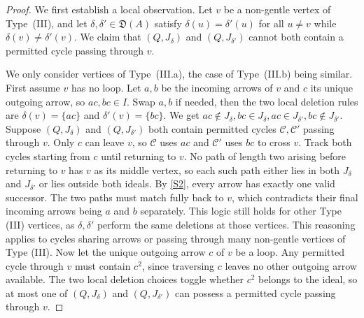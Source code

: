 \documentclass[11pt]{amsart}
\numberwithin{equation}{section}
\theoremstyle{definition}
\begin{document}
\begin{proof}
We first establish a local observation. Let \(v\) be a non-gentle vertex of Type~\textup{(III)}, and let \(\delta,\delta'\in\mathfrak D(A)\) satisfy \(\delta(u)=\delta'(u)\) for all \(u\neq v\) while \(\delta(v)\neq\delta'(v)\). We claim that \((Q,J_\delta)\) and \((Q,J_{\delta'})\) cannot both contain a permitted cycle passing through \(v\).

We only consider vertices of Type~\textup {(III.a)}, the case of Type~\textup {(III.b)} being similar. First assume \(v\) has no loop. Let \(a,b\) be the incoming arrows of \(v\) and \(c\) its unique outgoing arrow, so \(ac,bc\in I\). Swap \(a,b\) if needed, then the two local deletion rules are \(\delta(v)=\{ac\}\) and \(\delta'(v)=\{bc\}\). We get \(ac\notin J_\delta, bc\in J_\delta, ac\in J_{\delta'}, bc\notin J_{\delta'}\).
Suppose \((Q,J_\delta)\) and \((Q,J_{\delta'})\) both contain permitted cycles \(\mathcal C,\mathcal C'\) passing through \(v\). Only \(c\) can leave \(v\), so \(\mathcal C\) uses \(ac\) and \(\mathcal C'\) uses \(bc\) to cross \(v\). Track both cycles starting from \(c\) until returning to \(v\). No path of length two arising before returning to \(v\) has \(v\) as its middle vertex, so each such path either lies in both \(J_\delta\) and \(J_{\delta'}\) or lies outside both ideals. By \ref{S2}, every arrow has exactly one valid successor. The two paths must match fully back to \(v\), which contradicts their final incoming arrows being \(a\) and \(b\) separately. This logic still holds for other Type \textup{(III)} vertices, as \(\delta,\delta'\) perform the same deletions at those vertices. This reasoning applies to cycles sharing arrows or passing through many non-gentle vertices of Type \textup{(III)}.
Now let the unique outgoing arrow \(c\) of \(v\) be a loop. Any permitted cycle through \(v\) must contain \(c^2\), since traversing \(c\) leaves no other outgoing arrow available. The two local deletion choices toggle whether \(c^2\) belongs to the ideal, so at most one of $(Q,J_\delta)$ and $(Q,J_{\delta'})$ can possess a permitted cycle passing through \(v\). 


\end{proof}
\end{document}
